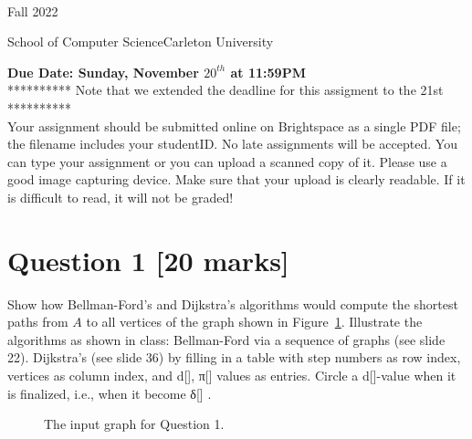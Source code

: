 \documentclass[11pt]{article}
\date{}
\begin{document}
\begin{center}
\\
Fall  2022\\

\end{center}
\noindent School of Computer Science\hfill{Carleton University}

\noindent \hrulefill

\vspace{5pt}
\noindent
{\bf Due Date: Sunday, November $ 20^{th}$ at 11:59PM}\\

**********  Note that we extended the deadline for this assigment to the  21st **********\\

\noindent
Your assignment should be submitted online on Brightspace as a single PDF file; the filename includes your studentID. No late assignments will be accepted. You can type your assignment or you can upload a scanned copy of it. Please use a good image capturing device. Make sure that your upload is clearly readable. If it is difficult to read, it will not be graded!




\section*{Question 1 [20 marks]}
Show how Bellman-Ford's and Dijkstra's algorithms would compute the shortest paths from $A$ to all vertices of the graph shown in Figure~\ref{fig:SP}. Illustrate the algorithms as shown in class:  Bellman-Ford via a sequence of graphs (see slide 22). Dijkstra's (see slide 36) by filling in a table with step numbers as row index, vertices as column index, and d[], π[] values as entries. Circle a d[]-value when it is finalized, i.e., when it become δ[] .

\begin{figure}[!ht]
\centerline{}
\caption{The input graph for Question 1.}
\label{fig:SP}
\end{figure}
\end{document}
